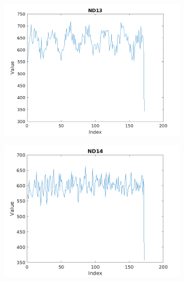 \documentclass{article}
\numberwithin{equation}{section}
\begin{document}
\begin{figure}[h]
    \centering
    \begin{subfigure}[b]{0.45\textwidth}
        \includegraphics[width=\textwidth]{ND13.png}
    \end{subfigure}
    \hfill
    \begin{subfigure}[b]{0.45\textwidth}
        \includegraphics[width=\textwidth]{ND14.png}
    \end{subfigure}
    \
    \begin{subfigure}[b]{0.45\textwidth}

\end{subfigure}
\end{figure}
\end{document}
